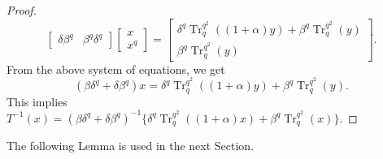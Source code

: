 \documentclass{birkjour}
\theoremstyle{definition}
\theoremstyle{remark}
\numberwithin{equation}{section}
\begin{document}
\begin{proof}
\[\begin{bmatrix}
		\delta\beta^{q}&\beta^{q}\delta^{q}
	\end{bmatrix}
	\begin{bmatrix}
		x\\x^{q}
	\end{bmatrix}
	=\begin{bmatrix}
		\delta^{q}\operatorname{Tr}_{q}^{q^2}((1+\alpha)y)+\beta^{q}\operatorname{Tr}_{q}^{q^2}(y)\\\beta^{q}\operatorname{Tr}_{q}^{q^2}(y)
	\end{bmatrix}.\]
	From the above system of equations, we get
	\[(\beta\delta^{q}+\delta\beta^{q})x=\delta^{q}\operatorname{Tr}_{q}^{q^2}((1+\alpha)y)+\beta^{q}\operatorname{Tr}_{q}^{q^2}(y).\]
	This implies\\
	$T^{-1}(x)=(\beta\delta^{q}+\delta\beta^{q})^{-1}\{\delta^{q}\operatorname{Tr}_{q}^{q^2}((1+\alpha)x)+\beta^{q}\operatorname{Tr}_{q}^{q^2}(x)\}$.
	\end{proof}
The following Lemma is used in the next Section.
\end{document}
